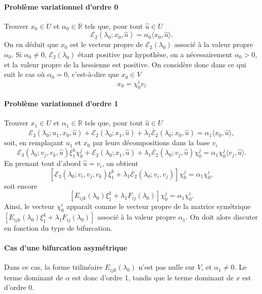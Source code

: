 \documentclass{article}
\newcommand{\nocomma}{}
\begin{document}
\paragraph{Probl{\`e}me variationnel d'ordre 0}Trouver $x_0 \in U$ et
$\alpha_0 \in \mathbb{R}$ tels que, pour tout $\hat{u} \in U$
\[ \mathcal{E}_2 (\lambda_0 ; x_0, \hat{u}) = \alpha_0  \langle x_0, \hat{u}
   \rangle . \]
On en d{\'e}duit que $x_0$ est le vecteur propre de $\mathcal{E}_2
(\lambda_0)$ associ{\'e} {\`a} la valeur propre $\alpha_0$. Si $\alpha_0 \neq
0$, $\mathcal{E}_2  (\lambda_0)$ {\'e}tant positive par hypoth{\`e}se, on a
n{\'e}cessairement $\alpha_0 > 0$, et la valeur propre de la hessienne est
positive. On consid{\`e}re donc dans ce qui suit le cas o{\`u} $\alpha_0 = 0$,
c'est-{\`a}-dire que $x_0 \in V$
\[ x_0 = \chi_0^i v_i \]


\paragraph{Probl{\`e}me variationnel d'ordre 1}Trouver $x_1 \in U$ et
$\alpha_1 \in \mathbb{R}$ tels que, pour tout $\hat{u} \in U$
\[ \mathcal{E}_3 (\lambda_0 ; u_1, x_0, \hat{u}) +\mathcal{E}_2 (\lambda_0 ;
   x_1, \hat{u}) + \lambda_1  \dot{\mathcal{E}_2} (\lambda_0 ; x_0, \hat{u}) =
   \alpha_1  \langle x_0, \hat{u} \rangle, \]
soit, en rempla{\c c}ant $u_1$ et $x_0$ par leurs d{\'e}compositions dans la
base $v_i$
\[ \mathcal{E}_3 (\lambda_0 ; v_j, v_k, \hat{u}) \xi_1^k \chi_0^j
   +\mathcal{E}_2 (\lambda_0 ; x_1, \hat{u}) + \lambda_1  \dot{\mathcal{E}_2}
   (\lambda_0 ; v_j, \hat{u}) \chi_0^j = \alpha_1 \chi_0^j  \langle v_j,
   \hat{u} \rangle . \]
En prenant tout d'abord $\hat{u} = v_i$, on obtient
\[ [\mathcal{E}_3 (\lambda_0 ; v_i, v_j, v_k) \xi_1^k + \lambda_1
   \dot{\mathcal{E}_2} (\lambda_0 ; v_i, v_j)] \chi_0^j = \alpha_1 \chi_0^i,
\]
soit encore
\[ [E_{i \nocomma j \nocomma k} (\lambda_0) \xi_1^k + \lambda_1 F_{i \nocomma
   j} (\lambda_0)] \chi_0^j = \alpha_1 \chi_0^i . \]
Ainsi, le vecteur $\chi_0^i$ appara{\^i}t comme le vecteur propre de la
matrice sym{\'e}trique $[E_{i \nocomma j \nocomma k} (\lambda_0) \xi_1^k +
\lambda_1 F_{i \nocomma j} (\lambda_0)]$ associ{\'e} {\`a} la valeur propre
$\alpha_1$. On doit alors discuter en fonction du type de bifurcation.

\paragraph{Cas d'une bifurcation asym{\'e}trique}Dans ce cas, la forme
trilin{\'e}aire $E_{i \nocomma j \nocomma k} (\lambda_0)$ n'est pas nulle sur
$V$, et $\alpha_1 \neq 0$. Le terme dominant de $\alpha$ est donc d'ordre 1,
tandis que le terme dominant de $x$ est d'ordre 0.
\end{document}
